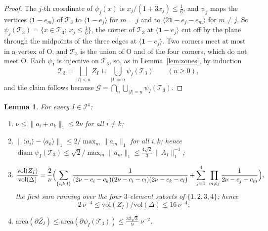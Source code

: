 \documentclass[11pt]{amsart}
\newtheorem{lemma}[proposition]{Lemma}
\theoremstyle{definition}
\theoremstyle{remark}
\newcommand{\one}{\mathbf 1}
\newcommand{\cI}{\mathcal I}
\newcommand{\cT}{\mathcal T}
\newcommand{\cG}{\mathcal G}
\newcommand{\Oct}{\mathrm{O}}
\newcommand{\abs}[1]{\lvert #1\rvert}
\newcommand{\norm}[1]{\lVert #1\rVert}
\newcommand{\pr}[1]{\langle #1\rangle}
\begin{document}
\begin{proof}
The $j$-th coordinate of $\psi_j(x)$ is $x_j/(1+3x_j)\le\frac16$, and $\psi_j$ maps the vertices $\pr{\one-e_m}$ of $\cT_3$ to $\pr{\one-e_j}$ for $m=j$ and to $\pr{2\one-e_j-e_m}$ for $m\ne j$. So $\psi_j(\cT_3)=\{x\in \cT_3:\ x_j\le\frac16\}$, the corner of $\cT_3$ at $\pr{\one-e_j}$ cut off by the plane through the midpoints of the three edges at $\pr{\one-e_j}$. Two corners meet at most in a vertex of $\Oct$, and $\cT_3$ is the union of $\Oct$ and of the four corners, which do not meet $\Oct$. Each $\psi_I$ is injective on $\cT_3$, so, as in Lemma~\ref{lem:zones}, by induction
\[
  \cT_3=\bigsqcup_{\abs I<n}Z_I\ \sqcup\ \bigcup_{\abs I=n}\psi_I(\cT_3)\qquad(n\ge0),
\]
and the claim follows because $\cG=\bigcap_n\bigcup_{\abs I=n}\psi_I(\cT_3)$.
\end{proof}

\begin{lemma}\label{lem:geom3}
For every $I\in\cI^4$:
\begin{enumerate}
\item[(i)] $\nu\le\norm{a_i+a_k}_1\le2\nu$ for all $i\neq k$;
\item[(ii)] $\norm{\pr{a_i}-\pr{a_k}}_1\le 2/\max_m\norm{a_m}_1$ for all $i,k$; hence
$\operatorname{diam}\psi_I(\cT_3)\le\sqrt2/\max_m\norm{a_m}_1\le\frac{4\sqrt2}3\,\norm{A_I}_1^{-1}$;
\item[(iii)]
\[
  \frac{\mathrm{vol}(Z_I)}{\mathrm{vol}(\Delta)}=\frac2\nu\Bigl(\sum_{\{i,k,l\}}\frac1{(2\nu-c_i-c_k)(2\nu-c_i-c_l)(2\nu-c_k-c_l)}+\sum_{j=1}^4\ \prod_{m\neq j}\frac1{2\nu-c_j-c_m}\Bigr),
\]
  the first sum running over the four $3$-element subsets of $\{1,2,3,4\}$; hence
  \[
    2\,\nu^{-4}\le\mathrm{vol}(Z_I)/\mathrm{vol}(\Delta)\le16\,\nu^{-4};
  \]
\item[(iv)] $\mathrm{area}(\partial\overline{Z_I})\le\mathrm{area}(\partial\psi_I(\cT_3))\le\frac{32\sqrt3}9\,\nu^{-2}$.
\end{enumerate}
\end{lemma}
\end{document}
